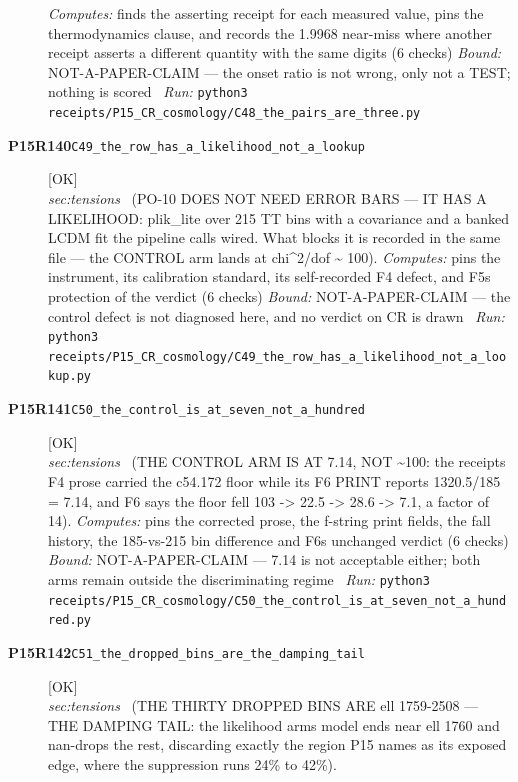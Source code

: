 \begin{description}
\emph{Computes:} finds the asserting receipt for each measured value, pins the thermodynamics clause, and records the 1.9968 near-miss where another receipt asserts a different quantity with the same digits (6 checks)
 \emph{Bound:} NOT-A-PAPER-CLAIM --- the onset ratio is not wrong, only not a TEST; nothing is scored
\ \emph{Run:} \texttt{python3 receipts/P15\_CR\_cosmology/C48\_the\_pairs\_are\_three.py}
\item[\rcptlabel{C49_the_row_has_a_likelihood_not_a_lookup}{P15R140}\textbf{P15R140}\quad\texttt{C49\_the\_row\_has\_a\_likelihood\_not\_a\_lookup}]\hfill\textsf{[OK]}\\
\textit{sec:tensions} \ (PO-10 DOES NOT NEED ERROR BARS --- IT HAS A LIKELIHOOD: plik\_lite over 215 TT bins with a covariance and a banked LCDM fit the pipeline calls wired. What blocks it is recorded in the same file --- the CONTROL arm lands at chi\textasciicircum{}2/dof \textasciitilde{} 100). 
\emph{Computes:} pins the instrument, its calibration standard, its self-recorded F4 defect, and F5s protection of the verdict (6 checks)
 \emph{Bound:} NOT-A-PAPER-CLAIM --- the control defect is not diagnosed here, and no verdict on CR is drawn
\ \emph{Run:} \texttt{python3 receipts/P15\_CR\_cosmology/C49\_the\_row\_has\_a\_likelihood\_not\_a\_lookup.py}
\item[\rcptlabel{C50_the_control_is_at_seven_not_a_hundred}{P15R141}\textbf{P15R141}\quad\texttt{C50\_the\_control\_is\_at\_seven\_not\_a\_hundred}]\hfill\textsf{[OK]}\\
\textit{sec:tensions} \ (THE CONTROL ARM IS AT 7.14, NOT \textasciitilde{}100: the receipts F4 prose carried the c54.172 floor while its F6 PRINT reports 1320.5/185 = 7.14, and F6 says the floor fell 103 -> 22.5 -> 28.6 -> 7.1, a factor of 14). 
\emph{Computes:} pins the corrected prose, the f-string print fields, the fall history, the 185-vs-215 bin difference and F6s unchanged verdict (6 checks)
 \emph{Bound:} NOT-A-PAPER-CLAIM --- 7.14 is not acceptable either; both arms remain outside the discriminating regime
\ \emph{Run:} \texttt{python3 receipts/P15\_CR\_cosmology/C50\_the\_control\_is\_at\_seven\_not\_a\_hundred.py}
\item[\rcptlabel{C51_the_dropped_bins_are_the_damping_tail}{P15R142}\textbf{P15R142}\quad\texttt{C51\_the\_dropped\_bins\_are\_the\_damping\_tail}]\hfill\textsf{[OK]}\\
\textit{sec:tensions} \ (THE THIRTY DROPPED BINS ARE ell 1759-2508 --- THE DAMPING TAIL: the likelihood arms model ends near ell 1760 and nan-drops the rest, discarding exactly the region P15 names as its exposed edge, where the suppression runs 24\% to 42\%). 

\end{description}
